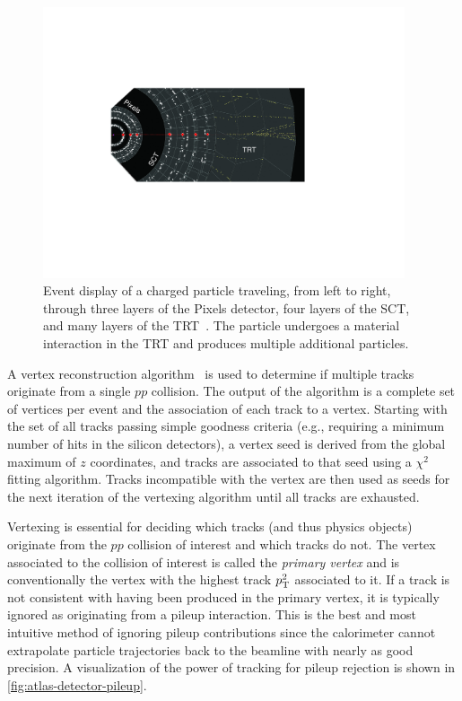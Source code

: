 \begin{figure}[tp]
  \centering
  \includegraphics[width=0.95\textwidth]{figures/lhc-atlas/detector-display-ID}
  \caption{Event display of a charged particle traveling, from left to right, through three layers of the Pixels detector, four layers of the SCT, and many layers of the TRT~\cite{SUSY-2011-14}. The particle undergoes a material interaction in the TRT and produces multiple additional particles.}
  \label{fig:atlas-detector-display-ID}
\end{figure}

A vertex reconstruction algorithm~\cite{ATLAS-CONF-2010-069,ATLAS-CONF-2012-042} is used to determine if multiple tracks originate from a single $pp$ collision. The output of the algorithm is a complete set of vertices per event and the association of each track to a vertex. Starting with the set of all tracks passing simple goodness criteria (e.g., requiring a minimum number of hits in the silicon detectors), a vertex seed is derived from the global maximum of $z$ coordinates, and tracks are associated to that seed using a $\chi^2$ fitting algorithm. Tracks incompatible with the vertex are then used as seeds for the next iteration of the vertexing algorithm until all tracks are exhausted. 

Vertexing is essential for deciding which tracks (and thus physics objects) originate from the $pp$ collision of interest and which tracks do not. The vertex associated to the collision of interest is called the \textit{primary vertex} and is conventionally the vertex with the highest track $p_{\mathrm{T}}^2$ associated to it. If a track is not consistent with having been produced in the primary vertex, it is typically ignored as originating from a pileup interaction. This is the best and most intuitive method of ignoring pileup contributions since the calorimeter cannot extrapolate particle trajectories back to the beamline with nearly as good precision. A visualization of the power of tracking for pileup rejection is shown in \cref{fig:atlas-detector-pileup}.

